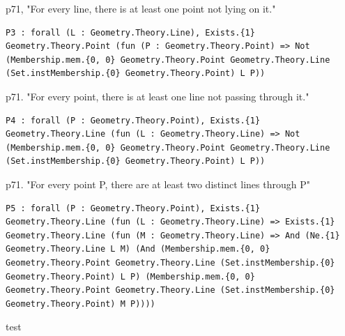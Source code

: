 
\begin{theorem}
  \label{Geometry.Ch2.Prop.P3}
  \leanok
  p71, "For every line, there is at least one point not lying on it." 
\begin{verbatim}P3 : forall (L : Geometry.Theory.Line), Exists.{1} Geometry.Theory.Point (fun (P : Geometry.Theory.Point) => Not (Membership.mem.{0, 0} Geometry.Theory.Point Geometry.Theory.Line (Set.instMembership.{0} Geometry.Theory.Point) L P))\end{verbatim}
\end{theorem}

\begin{theorem}
  \label{Geometry.Ch2.Prop.P4}
  \leanok
  p71. "For every point, there is at least one line not passing through it." 
\begin{verbatim}P4 : forall (P : Geometry.Theory.Point), Exists.{1} Geometry.Theory.Line (fun (L : Geometry.Theory.Line) => Not (Membership.mem.{0, 0} Geometry.Theory.Point Geometry.Theory.Line (Set.instMembership.{0} Geometry.Theory.Point) L P))\end{verbatim}
\end{theorem}

\begin{theorem}
  \label{Geometry.Ch2.Prop.P5}
  \leanok
  p71. "For every point P, there are at least two distinct lines through P" 
\begin{verbatim}P5 : forall (P : Geometry.Theory.Point), Exists.{1} Geometry.Theory.Line (fun (L : Geometry.Theory.Line) => Exists.{1} Geometry.Theory.Line (fun (M : Geometry.Theory.Line) => And (Ne.{1} Geometry.Theory.Line L M) (And (Membership.mem.{0, 0} Geometry.Theory.Point Geometry.Theory.Line (Set.instMembership.{0} Geometry.Theory.Point) L P) (Membership.mem.{0, 0} Geometry.Theory.Point Geometry.Theory.Line (Set.instMembership.{0} Geometry.Theory.Point) M P))))\end{verbatim}
\end{theorem}

\begin{lemma}
  \label{test_lemma}\leanok
  test
\end{lemma}

